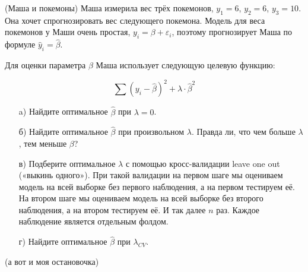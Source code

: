 \begin{problem}{(Маша и покемоны)}
 Маша измерила вес трёх покемонов,  $y_1=6$, $y_2=6$, $y_3=10$.  Она хочет спрогнозировать вес следующего покемона. Модель для веса покемонов у Маши очень простая, $y_i = \beta + \varepsilon_i$, поэтому прогнозирует Маша по формуле $\hat y_i = \hat \beta$.
	
	Для оценки параметра $\beta$ Маша использует следующую целевую функцию:
	
	$$
	\sum (y_i - \hat \beta)^2 + \lambda \cdot \hat \beta^2
	$$
	
	\begin{enumerate}
		\item[a)] Найдите оптимальное $\hat \beta$ при $\lambda =0$.
		\item[б)] Найдите оптимальное $\hat \beta$ при произвольном $\lambda$. Правда ли, что чем больше $\lambda$, тем меньше $\beta$? 
		\item[в)] Подберите оптимальное $\lambda$ с помощью кросс-валидации leave one out («выкинь одного»). При такой валидации на первом шаге мы оцениваем модель на всей выборке без первого наблюдения, а на первом тестируем её. На втором шаге мы оцениваем модель на всей выборке без второго наблюдения, а на втором тестируем её. И так далее $n$ раз. Каждое наблюдение является отдельным фолдом.
		\item[г)] Найдите оптимальное $\hat \beta$ при $\lambda_{CV}$.
	\end{enumerate}
\end{problem}


\begin{problem}{(а вот и моя остановочка)}
\end{problem}


